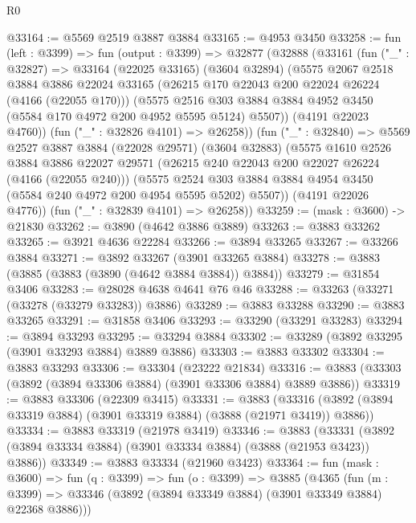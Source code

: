 \begin{lexlean}{R0}
\begin{coremodule}
@33164 := @5569 @2519 @3887 @3884
@33165 := @4953 @3450
@33258 := fun (left : @3399) =>
  fun (output : @3399) =>
  @32877
    (@32888
      (@33161
        (fun ("_" : @32827) =>
        @33164
          (@22025 @33165)
          (@3604 @32894)
          (@5575
            @2067
            @2518
            @3884
            @3886
            @22024
            @33165
            (@26215 @170 @22043 @200 @22024 @26224 (@4166 (@22055 @170)))
            (@5575
              @2516
              @303
              @3884
              @3884
              @4952
              @3450
              (@5584 @170 @4972 @200 @4952 @5595 @5124)
              @5507))
          (@4191 @22023 @4760))
        (fun ("_" : @32826 @4101) => @26258))
      (fun ("_" : @32840) =>
      @5569
        @2527
        @3887
        @3884
        (@22028 @29571)
        (@3604 @32883)
        (@5575
          @1610
          @2526
          @3884
          @3886
          @22027
          @29571
          (@26215 @240 @22043 @200 @22027 @26224 (@4166 (@22055 @240)))
          (@5575
            @2524
            @303
            @3884
            @3884
            @4954
            @3450
            (@5584 @240 @4972 @200 @4954 @5595 @5202)
            @5507))
        (@4191 @22026 @4776))
      (fun ("_" : @32839 @4101) => @26258))
@33259 := (mask : @3600) -> @21830
@33262 := @3890 (@4642 @3886 @3889)
@33263 := @3883 @33262
@33265 := @3921 @4636 @22284
@33266 := @3894 @33265
@33267 := @33266 @3884
@33271 := @3892 @33267 (@3901 @33265 @3884)
@33278 := @3883 (@3885 (@3883 (@3890 (@4642 @3884 @3884)) @3884))
@33279 := @31854 @3406
@33283 := @28028 @4638 @4641 @76 @46
@33288 := @33263 (@33271 (@33278 (@33279 @33283)) @3886)
@33289 := @3883 @33288
@33290 := @3883 @33265
@33291 := @31858 @3406
@33293 := @33290 (@33291 @33283)
@33294 := @3894 @33293
@33295 := @33294 @3884
@33302 := @33289 (@3892 @33295 (@3901 @33293 @3884) @3889 @3886)
@33303 := @3883 @33302
@33304 := @3883 @33293
@33306 := @33304 (@23222 @21834)
@33316 := @3883 (@33303 (@3892 (@3894 @33306 @3884) (@3901 @33306 @3884) @3889 @3886))
@33319 := @3883 @33306 (@22309 @3415)
@33331 := @3883
    (@33316 (@3892 (@3894 @33319 @3884) (@3901 @33319 @3884) (@3888 (@21971 @3419)) @3886))
@33334 := @3883 @33319 (@21978 @3419)
@33346 := @3883
    (@33331 (@3892 (@3894 @33334 @3884) (@3901 @33334 @3884) (@3888 (@21953 @3423)) @3886))
@33349 := @3883 @33334 (@21960 @3423)
@33364 := fun (mask : @3600) =>
  fun (q : @3399) =>
  fun (o : @3399) =>
  @3885
    (@4365
      (fun (m : @3399) => @33346 (@3892 (@3894 @33349 @3884) (@3901 @33349 @3884) @22368 @3886)))

\end{coremodule}
\end{lexlean}
